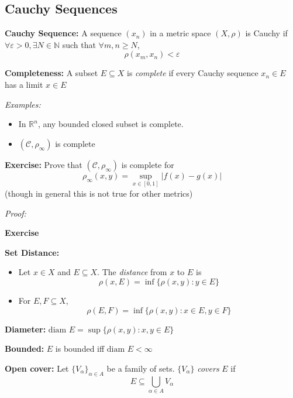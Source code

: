 \documentclass[12pt]{article}
\newcommand{\R}{\mathbb{R}}
\newcommand{\N}{\mathbb{N}}
\newcommand{\abs}[1]{\left\vert #1 \right\vert}
\newcommand{\ep}{\varepsilon}
\newcommand{\sub}{\subseteq}
\newcommand{\diam}{\text{diam }}
\newenvironment*{tbox}[2][gray]{
    \begin{tcolorbox}[
        parbox=false,
        colback=#1!5!white,
        colframe=#1!75!black,
        breakable,
        title={#2}
    ]}
    {\end{tcolorbox}}
\newenvironment*{exercise}[1][red]{
    \begin{tcolorbox}[
        parbox=false,
        colback=#1!5!white,
        colframe=#1!75!black,
        breakable
    ]}
    {\end{tcolorbox}}
\begin{document}
\subsection*{Cauchy Sequences}
    \textbf{Cauchy Sequence:} A sequence $(x_n)$ in a metric space $(X, \rho)$ is Cauchy if $\forall \ep > 0, \exists N \in \N$ such that $\forall m, n \geq N$,
    \[\rho(x_m, x_n) < \ep\]

    \textbf{Completeness:} A subset $E \sub X$ is \emph{complete} if every Cauchy sequence $x_n \in E$ has a limit $x \in E$

    \emph{Examples:} 
    \begin{itemize}
        \item In $\R^n$, any bounded closed subset is complete. 
        \item $(\mathcal C, \rho_{\infty})$ is complete 
    \end{itemize}

    \begin{exercise}
        \textbf{Exercise:} Prove that $(\mathcal C, \rho_{\infty})$ is complete for 
        \[\rho_{\infty}(x, y) = \sup_{x \in [0,1]} \abs{f(x) - g(x)}\] 
        (though in general this is not true for other metrics)
    \end{exercise}
    
    \begin{tbox}{\textbf{Proposition:} A closed subset $(X, \rho)$ of a complete metric space is complete and complete subsets of a metric space must be closed}
        \emph{Proof:} 
        
        \begin{exercise}
            \textbf{Exercise}
        \end{exercise}
    \end{tbox}

    \textbf{Set Distance:}
    \begin{itemize}
        \item Let $x \in X$ and $E \sub X$. The \emph{distance} from $x$ to $E$ is
        \[\rho(x, E) = \inf\{\rho(x, y): y \in E\}\] 
        \item For $E, F \sub X$, 
        \[\rho(E, F) = \inf\{\rho(x, y): x \in E, y \in F\}\]
    \end{itemize}

    \textbf{Diameter:} $\diam E = \sup\{\rho(x, y): x, y \in E\}$

    \textbf{Bounded:} $E$ is bounded iff $\diam E < \infty$

    \textbf{Open cover:} Let $\{V_{\alpha}\}_{\alpha \in A}$ be a family of sets. $\{V_{\alpha}\}$ \emph{covers} $E$ if 
    \[E \sub \bigcup_{\alpha \in A} V_{\alpha}\]
\end{document}
